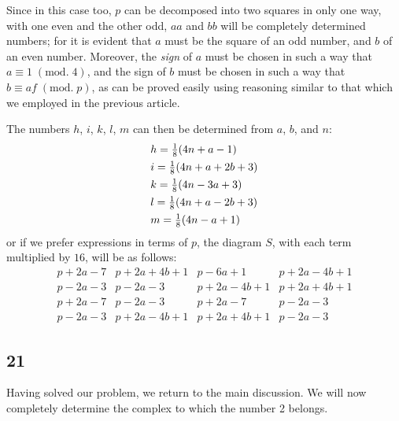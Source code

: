 \documentclass[twoside,12pt]{memoir}
\renewcommand{\pmod}[1]{\;(\textrm{mod.}\;#1)}
\let\oldfrac\frac
\def\frac#1#2{\mathchoice{\tfrac{#1}{#2}}{\oldfrac{#1}{#2}}{\genfrac{}{}{}{2}{#1}{#2\mathstrut}}{\genfrac{}{}{}{3}{#1}{#2\mathstrut}}}
\begin{document}
Since in this case too, \(p\) can be decomposed into two squares in only one way, with one even and the other odd, \(a a\) and \(b b\) will be completely determined numbers; for it is evident that \(a\) must be the square of an odd number, and \(b\) of an even number. Moreover, the \textit{sign} of \(a\) must be chosen in such a way that \(a \equiv 1\pmod{4}\), and the sign of \(b\) must be chosen in such a way that \(b \equiv af\pmod{p}\), as can be proved easily using reasoning similar to that which we employed in the previous article.

The numbers \(h\), \(i\), \(k\), \(l\), \(m\) can then be determined from \(a\), \(b\), and \(n\):
\[\begin{aligned}
&h = \frac{1}{8}(4n + a - 1) \\
&i = \frac{1}{8}(4n + a + 2b + 3) \\
&k = \frac{1}{8}(4n - 3a + 3) \\
&l = \frac{1}{8}(4n + a - 2b + 3) \\
&m = \frac{1}{8}(4n - a + 1)
\end{aligned}\]
or if we prefer expressions in terms of \(p\), the diagram \(S\), with each term multiplied by \(16\), will be as follows:
\[\begin{array}{l|l|l|l}
p+2a-7 & p+2a+4b+1 & p-6a+1 & p+2a-4b+1 \\
p-2a-3 & p-2a-3 & p+2a-4b+1 & p+2a+4b+1 \\
p+2a-7 & p-2a-3 & p+2a-7 & p-2a-3 \\
p-2a-3 & p+2a-4b+1 & p+2a+4b+1 & p-2a-3
\end{array}\]\pagebreak%

\subsection*{21}

Having solved our problem, we return to the main discussion.  We will now completely determine the complex to which the number 2 belongs.
\end{document}
